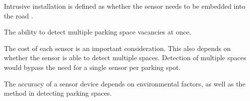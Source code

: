 \begin{description}[leftmargin=12em, style=nextline]
    \item[Intrusive Installation] Intrusive installation is defined as whether the sensor needs to be embedded into the road \citep{Lin2015SmartService}.
    \item[Multiple Detection] The ability to detect multiple parking space vacancies at once.
    \item[Cost] The cost of each sensor is an important consideration. This also depends on whether the sensor is able to detect multiple spaces. Detection of multiple spaces would bypass the need for a single sensor per parking spot.
    \item[Accuracy] The accuracy of a sensor device depends on environmental factors, as well as the method in detecting parking spaces.
\end{description}